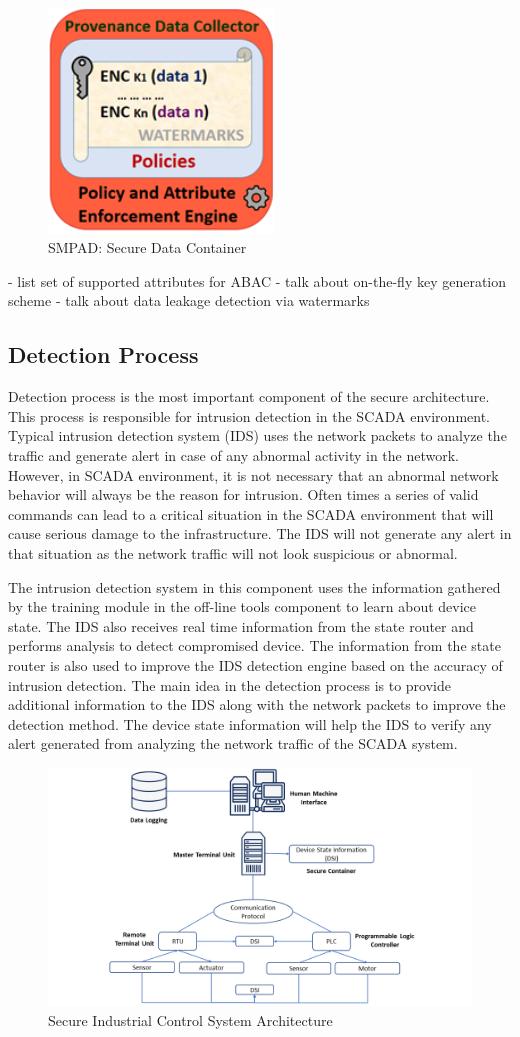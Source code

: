 \documentclass[conference]{IEEEtran}
\begin{document}
\begin{figure}[htbp]
\centering
\centerline{\includegraphics [width=6cm] {SMPAD.png}}
\caption{SMPAD: Secure Data Container}
\label{fig}
\end{figure}

- list set of supported attributes for ABAC
- talk about on-the-fly key generation scheme
- talk about data leakage detection via watermarks
 
\subsection{Detection Process}
Detection process is the most important component of the secure architecture. This process is responsible for intrusion detection in the SCADA environment. Typical intrusion detection system (IDS) uses the network packets to analyze the traffic and generate alert in case of any abnormal activity in the network. However, in SCADA environment, it is not necessary that an abnormal network behavior will always be the reason for intrusion. Often times a series of valid commands can lead to a critical situation in the SCADA environment that will cause serious damage to the infrastructure. The IDS will not generate any alert in that situation as the network traffic will not look suspicious or abnormal.
\par The intrusion detection system in this component uses the information gathered by the training module in the off-line tools component to learn about device state. The IDS also receives real time information from the state router and performs analysis to detect compromised device. The information from the state router is also used to improve the IDS detection engine based on the accuracy of intrusion detection. The main idea in the detection process is to provide additional information to the IDS along with the network packets to improve the detection method. The device state information will help the IDS to verify any alert generated from analyzing the network traffic of the SCADA system.  
\begin{figure}[htbp]
\centering
\centerline{\includegraphics [width=.5\textwidth]{sec_arch.png}}
\caption{Secure Industrial Control System Architecture}
\label{fig}
%
\end{figure}
\end{document}
